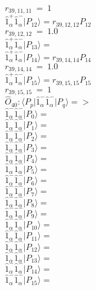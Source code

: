 \documentclass[14pt]{article}
\begin{document}
    ${r}_{39,11,11}\ =\ 1 $ \\ 
    $ \hat{1}_{\alpha}^{+}\hat{1}_{\alpha}^{-} \vert{P_{12}}\rangle = {r}_{39,12,12}P_{12} $ \\ 
    ${r}_{39,12,12}\ =\ 1.0 $ \\ 
    $ \hat{1}_{\alpha}^{+}\hat{1}_{\alpha}^{-} \vert{P_{13}}\rangle =  $ \\ 
    $ \hat{1}_{\alpha}^{+}\hat{1}_{\alpha}^{-} \vert{P_{14}}\rangle = {r}_{39,14,14}P_{14} $ \\ 
    ${r}_{39,14,14}\ =\ 1.0 $ \\ 
    $ \hat{1}_{\alpha}^{+}\hat{1}_{\alpha}^{-} \vert{P_{15}}\rangle = {r}_{39,15,15}P_{15} $ \\ 
    ${r}_{39,15,15}\ =\ 1 $ \\ 
    
    $\hat{O}_{40}:  \langle{P_p}\vert \hat{1}_{\alpha}^{-}\hat{1}_{\alpha}^{-} \vert{P_q}\rangle => $ \\ 
    $ \hat{1}_{\alpha}^{-}\hat{1}_{\alpha}^{-} \vert{P_{0}}\rangle =  $ \\ 
    $ \hat{1}_{\alpha}^{-}\hat{1}_{\alpha}^{-} \vert{P_{1}}\rangle =  $ \\ 
    $ \hat{1}_{\alpha}^{-}\hat{1}_{\alpha}^{-} \vert{P_{2}}\rangle =  $ \\ 
    $ \hat{1}_{\alpha}^{-}\hat{1}_{\alpha}^{-} \vert{P_{3}}\rangle =  $ \\ 
    $ \hat{1}_{\alpha}^{-}\hat{1}_{\alpha}^{-} \vert{P_{4}}\rangle =  $ \\ 
    $ \hat{1}_{\alpha}^{-}\hat{1}_{\alpha}^{-} \vert{P_{5}}\rangle =  $ \\ 
    $ \hat{1}_{\alpha}^{-}\hat{1}_{\alpha}^{-} \vert{P_{6}}\rangle =  $ \\ 
    $ \hat{1}_{\alpha}^{-}\hat{1}_{\alpha}^{-} \vert{P_{7}}\rangle =  $ \\ 
    $ \hat{1}_{\alpha}^{-}\hat{1}_{\alpha}^{-} \vert{P_{8}}\rangle =  $ \\ 
    $ \hat{1}_{\alpha}^{-}\hat{1}_{\alpha}^{-} \vert{P_{9}}\rangle =  $ \\ 
    $ \hat{1}_{\alpha}^{-}\hat{1}_{\alpha}^{-} \vert{P_{10}}\rangle =  $ \\ 
    $ \hat{1}_{\alpha}^{-}\hat{1}_{\alpha}^{-} \vert{P_{11}}\rangle =  $ \\ 
    $ \hat{1}_{\alpha}^{-}\hat{1}_{\alpha}^{-} \vert{P_{12}}\rangle =  $ \\ 
    $ \hat{1}_{\alpha}^{-}\hat{1}_{\alpha}^{-} \vert{P_{13}}\rangle =  $ \\ 
    $ \hat{1}_{\alpha}^{-}\hat{1}_{\alpha}^{-} \vert{P_{14}}\rangle =  $ \\ 
    $ \hat{1}_{\alpha}^{-}\hat{1}_{\alpha}^{-} \vert{P_{15}}\rangle =  $ \\ 
    
\end{document}
